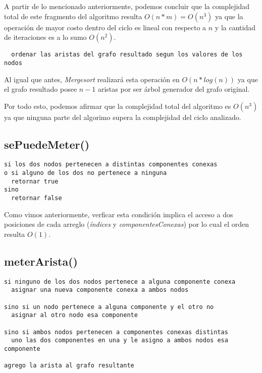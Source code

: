 \documentclass[a4paper,11pt] {article}
\begin{document}
A partir de lo mencionado anteriormente, podemos concluir que la complejidad total de este fragmento del algoritmo resulta $O(n*m) = O(n^3)$ ya que la operación de mayor costo dentro del ciclo es lineal con respecto a $n$ y la cantidad de iteraciones es a lo sumo $O(n^2)$.

\begin{verbatim}
  ordenar las aristas del grafo resultado segun los valores de los nodos
\end{verbatim}

Al igual que antes, \textit{Mergesort} realizará esta operación en $O(n*log(n))$ ya que el grafo resultado posee $n-1$ aristas por ser árbol generador del grafo original.

\bigskip
Por todo esto, podemos afirmar que la complejidad total del algoritmo es $O(n^3)$ ya que ninguna parte del algorimo supera la complejidad del ciclo analizado.

\subsection*{sePuedeMeter()}

\begin{verbatim}
si los dos nodos pertenecen a distintas componentes conexas
o si alguno de los dos no pertenece a ninguna
  retornar true
sino
  retornar false
\end{verbatim}

Como vimos anteriormente, verficar esta condición implica el acceso a dos posiciones de cada arreglo (\textit{índices} y \textit{componentesConexas}) por lo cual el orden resulta $O(1)$.

\subsection*{meterArista()}

\begin{verbatim}
si ninguno de los dos nodos pertenece a alguna componente conexa
  asignar una nueva componente conexa a ambos nodos

sino si un nodo pertenece a alguna componente y el otro no
  asignar al otro nodo esa componente

sino si ambos nodos pertenecen a componentes conexas distintas
  uno las dos componentes en una y le asigno a ambos nodos esa componente

agrego la arista al grafo resultante
\end{verbatim}
\end{document}

